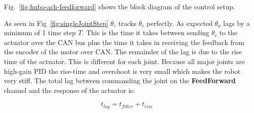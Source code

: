 Fig.~\ref{fig:hubo-ach-feedforward} shows the block diagram of the control setup.






As seen in Fig~\ref{fig:singleJointStep} $\theta_c$ tracks $\theta_r$ perfectly. As expected $\theta_a$ lags by a minimum of 1 time step $T$.  
This is the time it takes between sending $\theta_c$ to the actuator over the CAN bus plus the time it takes in receiving the feedback from the encoder of the motor over CAN.
The remainder of the lag is due to the rise time of the actuator.
This is different for each joint.
Because all major joints are high-gain PID the rise-time and overshoot is very small which makes the robot very stiff.
The total lag between commanding the joint on the \textbf{FeedForward} channel and the response of the actuator is:

\begin{equation}
t_{lag} = t_{filter} + t_{rise}
\end{equation}


